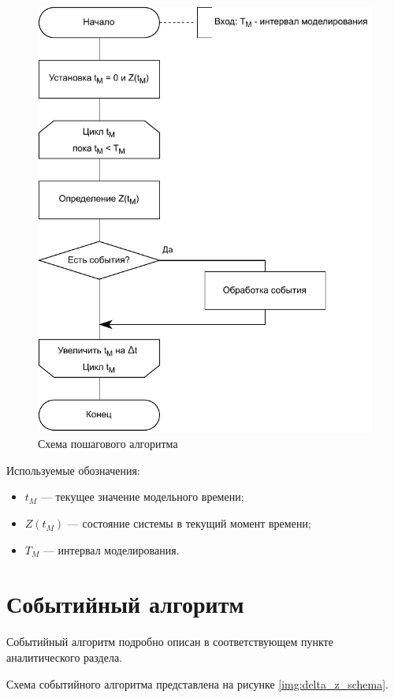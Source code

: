 \begin{figure}[h!btp]
	\centering
	\includegraphics[width=0.8\columnwidth]{inc/img/delta_t_schema.pdf}
	\caption{Схема пошагового алгоритма}
	\label{img:delta_t_schema}	
\end{figure}

Используемые обозначения:
\begin{itemize}
	\item $t_M$ --- текущее значение модельного времени;
	\item $Z(t_M)$ --- состояние системы в текущий момент времени;
	\item $T_M$ --- интервал моделирования.
\end{itemize}

\section{Событийный алгоритм}
Событийный алгоритм подробно описан в соответствующем пункте аналитического раздела. 

Схема событийного алгоритма представлена на рисунке \ref{img:delta_z_schema}.

